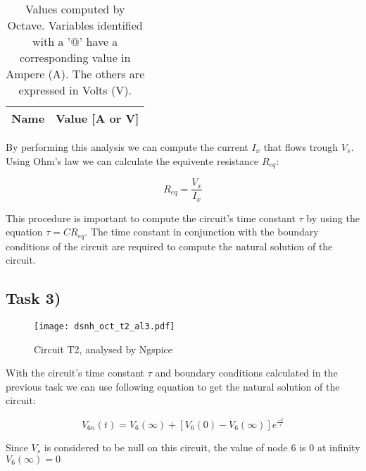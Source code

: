 \begin{table}[ht]
	\centering
	\begin{tabular}{|l|r|}
    		\hline    
    		{\bf Name} & {\bf Value [A or V]} \\ \hline
    		
  	\end{tabular}
  	\caption{Values computed by Octave. Variables identified with a '$@$' have a
  	corresponding value in Ampere (A). The others are expressed in Volts (V).}
 
\label{tab:node}
\end{table}


By performing this analysis we can compute the current $I_x$ that flows trough $V_s$. Using Ohm's law we can calculate the equivente resistance $R_{eq}$:

\[
R_{eq}=\frac{V_x}{I_x}
\]


This procedure is important to compute the circuit's time constant $\tau$ by using the equation $\tau = CR_{eq}$. The time constant in conjunction with the boundary conditions of the circuit are required to compute the natural solution of the circuit.



\newpage
\subsection{Task 3)}
\label{subsec:task3_a}

\begin{figure}[H]
	\centering
	\texttt{[image: dsnh\_oct\_t2\_al3.pdf]}
	\caption{Circuit T2, analysed by Ngspice}
\label{fig:Dsnh_sim_t2}
\end{figure}

With the circuit's time constant $\tau$ and boundary conditions calculated in the previous task we can use following equation to get the natural solution of the circuit:

\[
V_{6n}(t) = V_6(\infty) + [V_6(0) - V_6(\infty)]e^{\frac{-t}{\tau}}
\] 

Since $V_s$ is considered to be null on this circuit, the value of node 6 is 0 at infinity $V_6(\infty) = 0$ 




